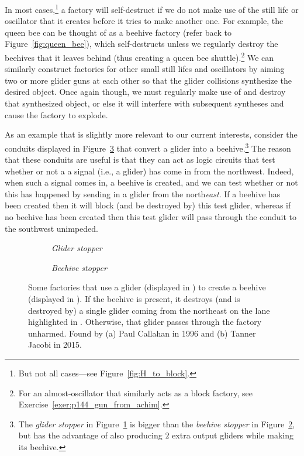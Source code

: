 In most cases,\footnote{But not all cases---see Figure~\ref{fig:H_to_block}.} a factory will self-destruct if we do not make use of the still life or oscillator that it creates before it tries to make another one. For example, the queen bee can be thought of as a beehive factory (refer back to Figure~\ref{fig:queen_bee}), which self-destructs unless we regularly destroy the beehives that it leaves behind (thus creating a queen bee shuttle).\footnote{For an almost-oscillator that similarly acts as a block factory, see Exercise~\ref{exer:p144_gun_from_achim}.} We can similarly construct factories for other small still lifes and oscillators by aiming two or more glider guns at each other so that the glider collisions synthesize the desired object. Once again though, we must regularly make use of and destroy that synthesized object, or else it will interfere with subsequent syntheses and cause the factory to explode.

As an example that is slightly more relevant to our current interests, consider the conduits displayed in Figure~\ref{fig:glider_beehive_stopper} that convert a glider into a beehive.\footnote{The \emph{glider stopper} in Figure~\ref{fig:glider_stopper} is bigger than the \emph{beehive stopper} in Figure~\ref{fig:beehive_stopper}, but has the advantage of also producing $2$ extra output gliders while making its beehive.} The reason that these conduits are useful is that they can act as logic circuits that test whether or not a a signal (i.e., a glider) has come in from the northwest. Indeed, when such a signal comes in, a beehive is created, and we can test whether or not this has happened by sending in a glider from the north\emph{east}. If a beehive has been created then it will block (and be destroyed by) this test glider, whereas if no beehive has been created then this test glider will pass through the conduit to the southwest unimpeded.

\begin{figure}[!htb]
	\centering
	\begin{subfigure}{.53\textwidth}
		\centering{}
		\caption{\emph{Glider stopper}}\label{fig:glider_stopper}
	\end{subfigure} \hfill
	\begin{subfigure}{.43\textwidth}
		\centering{}
		\caption{\emph{Beehive stopper}}\label{fig:beehive_stopper}
	\end{subfigure}
	\caption{Some factories that use a glider (displayed in ) to create a beehive (displayed in ). If the beehive is present, it destroys (and is destroyed by) a single glider coming from the northeast on the lane highlighted in . Otherwise, that glider passes through the factory unharmed. Found by (a) Paul Callahan in 1996 and (b) Tanner Jacobi in 2015.}
	\label{fig:glider_beehive_stopper}
\end{figure}


